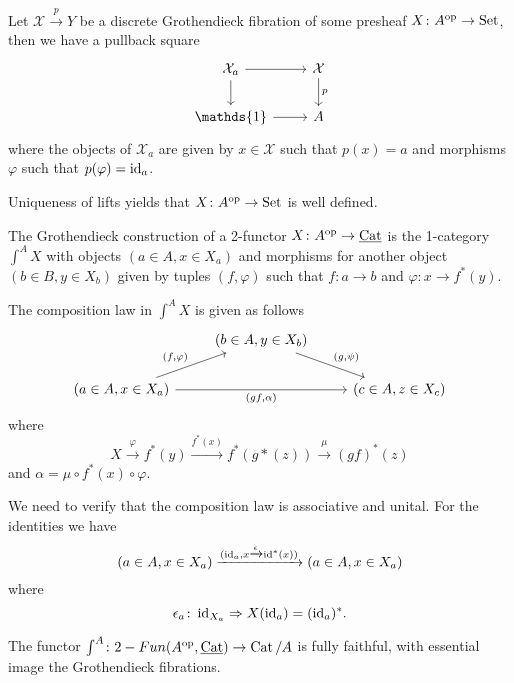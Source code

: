 \begin{Idea}
	Let $ \mathcal{X} \xrightarrow{ p } Y $ be a discrete Grothendieck fibration of some presheaf $ X \colon A^{ \operatorname{op} } \to \operatorname{Set} $, then we have a pullback square
	\[
	\begin{tikzcd}
		\mathcal{ X }_a 
		\ar[r]
		\ar[d]
		&
		\mathcal{ X }
		\ar[d, " p"]
		\\
		\mathds{1}
		\ar[r]
		&
		A
	\end{tikzcd}
	\]
	where the objects of $ \mathcal{ X }_a $ are given by $ x \in \mathcal{ X } $ such that $ p ( x ) = a $ and morphisms $ \varphi $ such that $ p ( \varphi ) = \operatorname{id}_a $.
	
	
	Uniqueness of lifts yields that $ X \colon A ^{ \operatorname{op} } \to \operatorname{Set} $ is well defined.
\end{Idea}

\begin{defi}
	The Grothendieck construction of a 2-functor $ X \colon A^{ \operatorname{op} } \to \underline{\operatorname{Cat}} $ is the 1-category $ \int^A X $ with objects $ ( a \in A , x \in X_a ) $ and morphisms for another object $ ( b \in B , y \in X_b )$ given by tuples $ ( f , \varphi ) $ such that $ f \colon a \to b $ and $ \varphi \colon x \to f^* ( y ) $.
	
	The composition law in $ \int^A X $ is given as follows
	\[
	\begin{tikzcd}	
		&
		( b \in A , y \in X_b )
		\ar[rd, "{ ( g , \psi ) }"]
		&
		\\
		(a \in A , x \in X_a )
		\ar[ru, "{ ( f , \varphi ) }"]
		\ar[rr, "{ ( gf , \alpha ) }"']
		&&
		( c \in A , z \in X_c )
	\end{tikzcd}
	\]
	where
	\[
		X \xrightarrow{ \varphi } f^* ( y ) \xrightarrow{ f^* ( x ) } f^* ( g* ( z )) \xrightarrow{ \mu } ( gf )^*( z )
	\] 
	and $ \alpha = \mu \circ f^*( x ) \circ \varphi $.
\end{defi}

We need to verify that the composition law is associative and unital.
For the identities we have 
\[
	( a \in A , x \in X_a ) \xrightarrow{ ( \operatorname{id}_a , x \xrightarrow{ \epsilon } \operatorname{id}^* ( x ) ) } ( a \in A , x \in X_a ) 
\] 
where 
\[
	\epsilon_a \colon \operatorname{id}_{X_a } \Rightarrow X ( \operatorname{id}_a ) = ( \operatorname{id}_a )^*.
\]

\begin{thm}
	The functor $ \int^A \colon 2-Fun ( A^{ \operatorname{op} } , \underline{\operatorname{Cat} } ) \to \operatorname{Cat} /A $ is fully faithful, with essential image the Grothendieck fibrations.
\end{thm}

